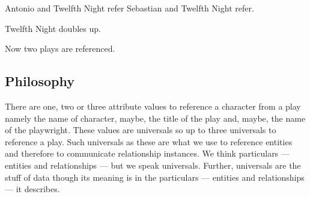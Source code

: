 Antonio and Twelfth Night refer
Sebastian and Twelfth Night refer.

Twelfth Night doubles up.

Now two plays are referenced.



\subsection{Philosophy}
\mynote
There are one, two or three attribute values to reference a character from a play namely
the name of character, maybe, the title of the play and, maybe, the name of the playwright. 
These values are universals so up to three universals to reference a play. 
Such universals as these are what we use to reference entities 
and therefore to communicate relationship instances.
\mynote
We think particulars --- entities and relationships --- but we speak universals.
\mynote
Further, universals are the stuff of data though its meaning is in the 
particulars --- entities and relationships --- it describes. 

\newpage


 
